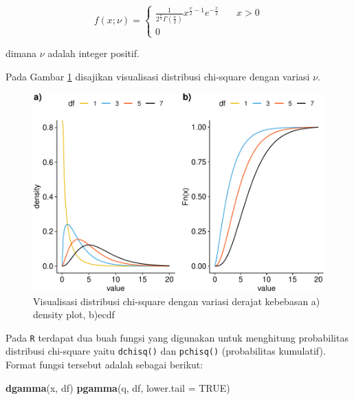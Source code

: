\documentclass[]{book}
\newenvironment{Shaded}{\begin{snugshade}}{\end{snugshade}}
\newcommand{\KeywordTok}[1]{\textcolor[rgb]{0.13,0.29,0.53}{\textbf{#1}}}
\newcommand{\DataTypeTok}[1]{\textcolor[rgb]{0.13,0.29,0.53}{#1}}
\newcommand{\OtherTok}[1]{\textcolor[rgb]{0.56,0.35,0.01}{#1}}
\newcommand{\NormalTok}[1]{#1}
\begin{document}
\begin{equation}
f\left(x;\nu \right) =
  \begin{cases}
    \frac{1}{2^{\frac{\nu}{2}}\Gamma\left(\frac{\nu}{2}\right)}x^{\frac{\nu}{2}-1}e^{-\frac{x}{2}}       & \quad x>0\\
    0                   & \quad\text{}
    \end{cases}
 \label{eq:dcsq}
\end{equation}

dimana \(\nu\) adalah integer positif.

Pada Gambar \ref{fig:csqvis} disajikan visualisasi distribusi chi-square
dengan variasi \(\nu\).

\begin{figure}

{\centering \includegraphics[width=0.9\linewidth]{EnvStat_files/figure-latex/csqvis-1} 

}

\caption{Visualisasi distribusi chi-square dengan variasi derajat kebebasan a) density plot, b)ecdf}\label{fig:csqvis}
\end{figure}

Pada \texttt{R} terdapat dua buah fungsi yang digunakan untuk menghitung
probabilitas distribusi chi-square yaitu \texttt{dchisq()} dan
\texttt{pchisq()} (probabilitas kumulatif). Format fungsi tersebut
adalah sebagai berikut:

\begin{Shaded}
\begin{Highlighting}[]
\KeywordTok{dgamma}\NormalTok{(x, df)}
\KeywordTok{pgamma}\NormalTok{(q, df, }\DataTypeTok{lower.tail =} \OtherTok{TRUE}\NormalTok{)}
\end{Highlighting}
\end{Shaded}
\end{document}
